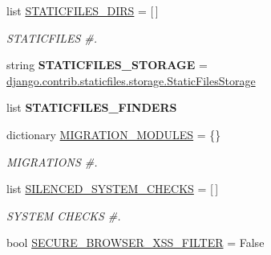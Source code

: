\begin{DoxyCompactItemize}
list \mbox{\hyperlink{namespacedjango_1_1conf_1_1global__settings_a77c1bc7077c48586c9679bb99cdab239}{S\+T\+A\+T\+I\+C\+F\+I\+L\+E\+S\+\_\+\+D\+I\+RS}} = \mbox{[}$\,$\mbox{]}
\begin{DoxyCompactList}\small\item\em S\+T\+A\+T\+I\+C\+F\+I\+L\+ES \#. \end{DoxyCompactList}\item 
\mbox{\label{namespacedjango_1_1conf_1_1global__settings_a80f2a2a6f6b8d5b1b25df407144b5056}} 
string {\bfseries S\+T\+A\+T\+I\+C\+F\+I\+L\+E\+S\+\_\+\+S\+T\+O\+R\+A\+GE} = \textquotesingle{}\mbox{\hyperlink{classdjango_1_1contrib_1_1staticfiles_1_1storage_1_1_static_files_storage}{django.\+contrib.\+staticfiles.\+storage.\+Static\+Files\+Storage}}\textquotesingle{}
\item 
list {\bfseries S\+T\+A\+T\+I\+C\+F\+I\+L\+E\+S\+\_\+\+F\+I\+N\+D\+E\+RS}
\item 
\mbox{\label{namespacedjango_1_1conf_1_1global__settings_a6c8e48a673e28448e7f6c30d9b700c54}} 
dictionary \mbox{\hyperlink{namespacedjango_1_1conf_1_1global__settings_a6c8e48a673e28448e7f6c30d9b700c54}{M\+I\+G\+R\+A\+T\+I\+O\+N\+\_\+\+M\+O\+D\+U\+L\+ES}} = \{\}
\begin{DoxyCompactList}\small\item\em M\+I\+G\+R\+A\+T\+I\+O\+NS \#. \end{DoxyCompactList}\item 
\mbox{\label{namespacedjango_1_1conf_1_1global__settings_a39e3e259919f4fb4a70ca8947ed2dbec}} 
list \mbox{\hyperlink{namespacedjango_1_1conf_1_1global__settings_a39e3e259919f4fb4a70ca8947ed2dbec}{S\+I\+L\+E\+N\+C\+E\+D\+\_\+\+S\+Y\+S\+T\+E\+M\+\_\+\+C\+H\+E\+C\+KS}} = \mbox{[}$\,$\mbox{]}
\begin{DoxyCompactList}\small\item\em S\+Y\+S\+T\+EM C\+H\+E\+C\+KS \#. \end{DoxyCompactList}\item 
\mbox{\label{namespacedjango_1_1conf_1_1global__settings_adcc553c98300a1cba05f80e171a47c82}} 
bool \mbox{\hyperlink{namespacedjango_1_1conf_1_1global__settings_adcc553c98300a1cba05f80e171a47c82}{S\+E\+C\+U\+R\+E\+\_\+\+B\+R\+O\+W\+S\+E\+R\+\_\+\+X\+S\+S\+\_\+\+F\+I\+L\+T\+ER}} = False

\end{DoxyCompactItemize}
